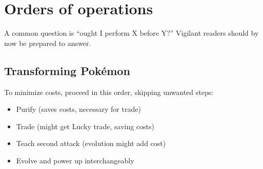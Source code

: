 \chapter{Orders of operations\label{chap:ooo}}
A common question is ``ought I perform X before Y?''
Vigilant readers should by now be prepared to answer.

\section{Transforming Pokémon\label{sec:pokemontransforms}}
To minimize costs, proceed in this order, skipping unwanted steps:
\begin{itemize}
\item Purify (saves costs, necessary for trade)
\item Trade (might get Lucky trade, saving costs)
\item Teach second attack (evolution might add cost)
\item Evolve and power up interchangeably
\end{itemize}


